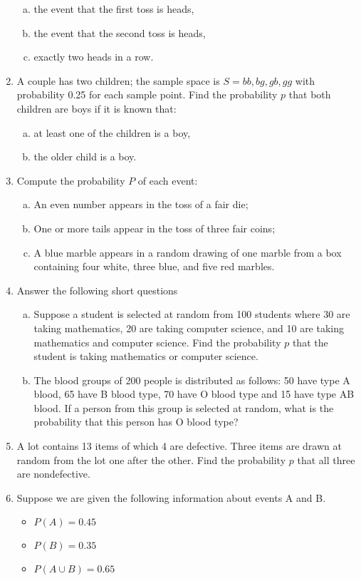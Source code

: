 \documentclass[]{article}
\begin{document}
\begin{enumerate}
\begin{enumerate}[(a)]
\item the event that the first toss is heads,
\item the event that the second toss is heads,
\item exactly two heads in a row.
\end{enumerate}
    \item 
A couple has two children; the sample space is $S = {bb, bg, gb, gg}$ with probability 0.25 for each sample point. Find the probability $p$ that both children are boys if it is known that: 
\begin{enumerate}[(a)]
\item at least one of the children is a boy,
\item the older child is a boy.
\end{enumerate}
    \item 
Compute the probability $P$ of each event:
\begin{enumerate}[(a)]
\item An even number appears in the toss of a fair die;
\item  One or more tails appear in the toss of three fair coins;
\item  A blue marble appears in a random drawing of one marble from a box containing four white, three blue, and five red marbles.
\end{enumerate}
    \item Answer the following short questions
\begin{enumerate}[(a)]
\item Suppose a student is selected at random from 100 students where 30 are taking mathematics, 20 are taking computer science, and 10 are taking mathematics and computer science. Find the probability $p$ that the student is taking mathematics or computer science.
\item 
The blood groups of 200 people is distributed as follows: 50 have type A blood, 65 have B blood type, 70 have O blood type and 15 have type AB blood. If a person from this group is selected at random, what is the probability that this person has O blood type?
\end{enumerate}

    \item 
A lot contains 13 items of which 4 are defective. Three items are drawn at random from the lot one after the other. Find the probability $p$ that all three are nondefective.
    \item 
Suppose we are given the following information about events A and B.
\begin{itemize}
    \item $P(A) = 0.45$
    \item $P(B) = 0.35$
    \item $P(A \cup B) = 0.65$
    

\end{itemize}
\end{enumerate}
\end{document}
